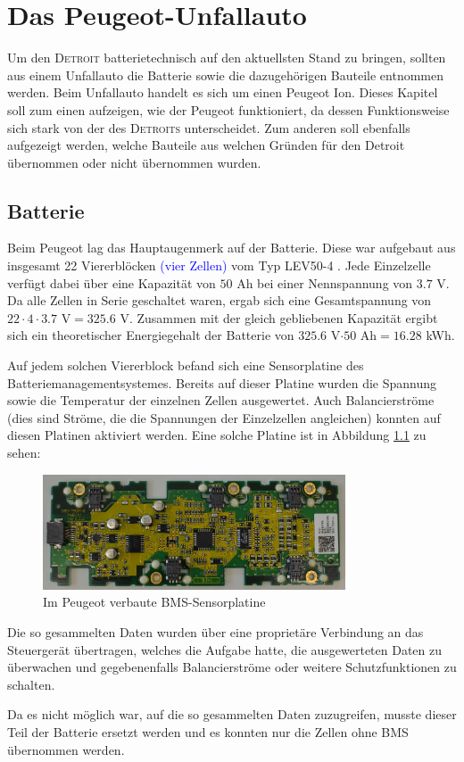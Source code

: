 \chapter{Das Peugeot-Unfallauto}
Um den \textsc{Detroit} batterietechnisch auf den aktuellsten Stand zu bringen, sollten aus einem Unfallauto die Batterie sowie die dazugehörigen Bauteile entnommen werden. Beim Unfallauto handelt es sich um einen Peugeot Ion. Dieses Kapitel soll zum einen aufzeigen, wie der Peugeot funktioniert, da dessen Funktionsweise sich stark von der des \textsc{Detroits} unterscheidet. Zum anderen soll ebenfalls aufgezeigt werden, welche Bauteile aus welchen Gründen für den {Detroit} übernommen oder nicht übernommen wurden.

\section{Batterie}
Beim Peugeot lag das Hauptaugenmerk auf der Batterie. Diese war aufgebaut aus insgesamt 22 Viererblöcken \textcolor{blue}{(vier Zellen)} vom Typ LEV50-4 \cite{lev50}. Jede Einzelzelle verfügt dabei über eine Kapazität von $50$ Ah bei einer Nennspannung von $3.7$ V. Da alle Zellen in Serie geschaltet waren, ergab sich eine Gesamtspannung von $22\cdot 4\cdot 3.7$ V$=325.6$ V. Zusammen mit der gleich gebliebenen Kapazität ergibt sich ein theoretischer Energiegehalt der Batterie von $325.6$ V$\cdot50$ Ah$=16.28$ kWh.

Auf jedem solchen Viererblock befand sich eine Sensorplatine des Batteriemanagementsystemes. Bereits auf dieser Platine wurden die Spannung sowie die Temperatur der einzelnen Zellen ausgewertet. Auch Balancierströme (dies sind Ströme, die die Spannungen der Einzelzellen angleichen) konnten auf diesen Platinen aktiviert werden. Eine solche Platine ist in Abbildung \ref{fig:BMS_Alt} zu sehen:

\begin{figure}[h!]
	\centering
		\includegraphics[width=0.80\textwidth]{images/BMS_Alt.JPG}
	\caption{Im Peugeot verbaute BMS-Sensorplatine}
	\label{fig:BMS_Alt}
\end{figure}

Die so gesammelten Daten wurden über eine proprietäre Verbindung an das Steuergerät übertragen, welches die Aufgabe hatte, die ausgewerteten Daten zu überwachen und gegebenenfalls Balancierströme oder weitere Schutzfunktionen zu schalten.

Da es nicht möglich war, auf die so gesammelten Daten zuzugreifen, musste dieser Teil der Batterie ersetzt werden und es konnten nur die Zellen ohne BMS übernommen werden.


\newpage